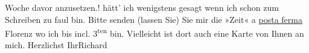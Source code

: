 \begin{ledgroupsized}[t]{13cm}
{{{                  Woche davor anzusetzen.}}}\label{K_L00373_1h}! hätt’ ich wenigstens gesagt wenn ich schon zum
               Schreiben zu faul bin.\pend
           \pstart
           Bitte senden (lassen Sie) Sie mir die »Zeit« a \uline{posta ferma}{ }Florenz wo ich bis incl. 3\textsuperscript{ten} bin. Vielleicht ist dort auch eine Karte von Ihnen an mich.\pend
           \pstart  Herzlichst Ihr\spacefill\mbox{Richard}\pend{}\endnumbering{}\end{ledgroupsized}  \newcommand{\dateiname}{L00373}\newcommand{\titel}{Richard Beer-Hofmann an Arthur Schnitzler, 2[6?]. 9. 1894}\newcommand{\editorInnen}{Martin Anton Müller und Gerd-Hermann Susen}
      